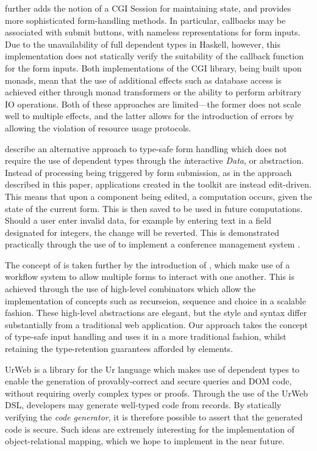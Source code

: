 \documentclass[preprint]{sigplanconf}
\begin{document}
\citet{thiemann:wash} further adds the notion of a CGI Session for maintaining
state, and provides more sophisticated form-handling methods. In particular,
callbacks may be associated with submit buttons, with nameless representations
for form inputs. Due to the unavailability of full dependent types in Haskell,
however, this implementation does not statically verify the suitability of the
callback function for the form inputs. Both implementations of the CGI library,
being built upon monads, mean that the use of additional effects such as
database access is achieved either through monad transformers or the ability to
perform arbitrary IO operations. Both of these approaches are limited---the
former does not scale well to multiple effects, and the latter allows for the
introduction of errors by allowing the violation of resource usage protocols.

\citet{plasmeijer:idata} describe an alternative approach to type-safe form
handling which does not require the use of dependent types through the
\textit{i}nteractive \textit{Data}, or \idata{} abstraction. Instead of
processing being triggered by form submission, as in the approach described in
this paper, applications created in the \idata{} toolkit are instead
edit-driven. This means that upon a component being edited, a computation
occurs, given the state of the current form. This is then saved to be used in
future computations. Should a user enter invalid data, for example by entering
text in a field designated for integers, the change will be reverted. This is
demonstrated practically through the use of \idata{} to implement a conference
management system \cite{plasmeijer:cms}.

The concept of \idata{} is taken further by the introduction of \itasks{}
\cite{plasmeijer:itasks}, which make use of a workflow system to allow multiple
\idata{} forms to interact with one another. This is achieved through the use
of high-level combinators which allow the implementation of concepts such as
recurseion, sequence and choice in a scalable fashion. These high-level
abstractions are elegant, but the style and syntax differ substantially from a
traditional web application. Our approach takes the concept of type-safe input
handling and uses it in a more traditional fashion, whilst retaining the
type-retention guarantees afforded by \idata{} elements.

Ur\/Web \cite{urweb} is a library for the Ur language which makes use of
dependent types to enable the generation of provably-correct and secure queries
and DOM code, without requiring overly complex types or proofs. Through the use
of the Ur\/Web DSL, developers may generate well-typed code from records. By
statically verifying the \textit{code generator}, it is therefore possible to
assert that the generated code is secure. Such ideas are extremely interesting
for the implementation of object-relational mapping, which we hope to implement
in the near future.
\end{document}
